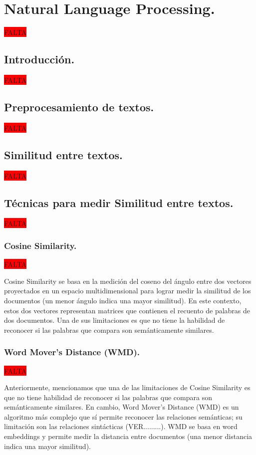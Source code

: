 \documentclass[12pt,a4paper]{article}
\begin{document}
\section{Natural Language Processing.}
\colorbox{red}{FALTA}

\subsection{Introducción.}
\colorbox{red}{FALTA}

\subsection{Preprocesamiento de textos.}
\colorbox{red}{FALTA}

\subsection{Similitud entre textos.}
\colorbox{red}{FALTA}

\subsection{Técnicas para medir Similitud entre textos.}
\colorbox{red}{FALTA}

\subsubsection{Cosine Similarity.}
\colorbox{red}{FALTA}

Cosine Similarity se basa en la medición del coseno del ángulo entre dos vectores proyectados en un espacio multidimensional para lograr medir la similitud de los documentos (un menor ángulo indica una mayor similitud). En este contexto, estos dos vectores representan matrices que contienen el recuento de palabras de dos documentos. Una de sus limitaciones es que  no tiene la habilidad de reconocer si las palabras que compara son semánticamente similares.

\subsubsection{Word Mover's Distance (WMD).}
\colorbox{red}{FALTA}

Anteriormente, mencionamos que una de las limitaciones de Cosine Similarity es que no tiene habilidad de reconocer si las palabras que compara son semánticamente similares. En cambio, Word Mover's Distance (WMD) es un algoritmo más complejo que sí permite reconocer las relaciones semánticas; su limitación son las relaciones sintácticas (VER.........). WMD se basa en word embeddings y permite medir la distancia entre documentos (una menor distancia indica una mayor similitud).
\end{document}
